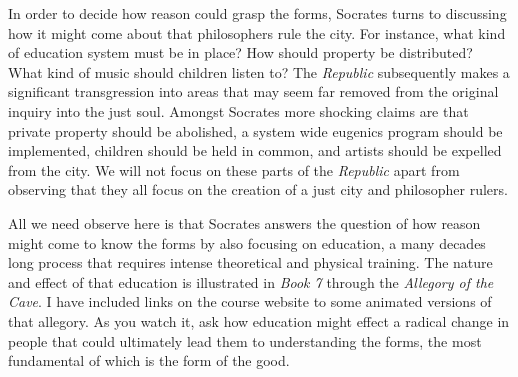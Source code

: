 \documentclass[oneside]{article}
\begin{document}
In order to decide how reason could grasp the forms, Socrates turns to discussing how it might come about that philosophers rule the city. For instance, what kind of education system must be in place? How should property be distributed? What kind of music should children listen to?  The \emph{Republic} subsequently makes a significant transgression into areas that may seem far removed from the original inquiry into the just soul. Amongst Socrates more shocking claims are that private property should be abolished, a system wide eugenics program should be implemented, children should be held in common, and artists should be expelled from the city. We will not focus on these parts of the \emph{Republic} apart from observing that they all focus on the creation of a just city and philosopher rulers. 

All we need observe here is that Socrates answers the question of how reason might come to know the forms by also focusing on education, a many decades long process that requires intense theoretical and physical training. The nature and effect of that education is illustrated in \emph{Book 7} through the \emph{Allegory of the Cave}. I have included links on the course website to some animated versions of that allegory. As you watch it, ask how education might effect a radical change in people that could ultimately lead them to understanding the forms, the most fundamental of which is the form of the good.
\end{document}
